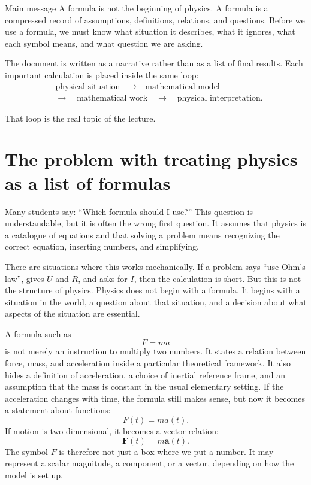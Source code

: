 \documentclass[11pt,a4paper]{article}
\newcommand{\vect}[1]{\boldsymbol{#1}}
\begin{document}
\begin{principlebox}{Main message}
A formula is not the beginning of physics. A formula is a compressed record of assumptions, definitions, relations, and questions. Before we use a formula, we must know what situation it describes, what it ignores, what each symbol means, and what question we are asking.
\end{principlebox}

The document is written as a narrative rather than as a list of final results. Each important calculation is placed inside the same loop:
\[
\begin{aligned}
&\text{physical situation}\quad\longrightarrow\quad\text{mathematical model}\\
&\longrightarrow\quad\text{mathematical work}\quad\longrightarrow\quad\text{physical interpretation}.
\end{aligned}
\]

That loop is the real topic of the lecture.

\newpage

\section{The problem with treating physics as a list of formulas}

Many students say: ``Which formula should I use?'' This question is understandable, but it is often the wrong first question. It assumes that physics is a catalogue of equations and that solving a problem means recognizing the correct equation, inserting numbers, and simplifying.

There are situations where this works mechanically. If a problem says ``use Ohm's law'', gives $U$ and $R$, and asks for $I$, then the calculation is short. But this is not the structure of physics. Physics does not begin with a formula. It begins with a situation in the world, a question about that situation, and a decision about what aspects of the situation are essential.

A formula such as
\[
F = ma
\]
is not merely an instruction to multiply two numbers. It states a relation between force, mass, and acceleration inside a particular theoretical framework. It also hides a definition of acceleration, a choice of inertial reference frame, and an assumption that the mass is constant in the usual elementary setting. If the acceleration changes with time, the formula still makes sense, but now it becomes a statement about functions:
\[
F(t) = m a(t).
\]
If motion is two-dimensional, it becomes a vector relation:
\[
\vect F(t) = m\vect a(t).
\]
The symbol $F$ is therefore not just a box where we put a number. It may represent a scalar magnitude, a component, or a vector, depending on how the model is set up.
\end{document}
